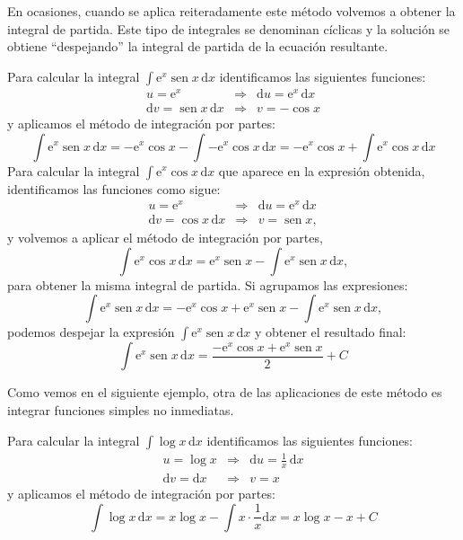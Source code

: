 En ocasiones, cuando se aplica reiteradamente este método volvemos a obtener la integral de partida.
Este tipo de integrales se denominan cíclicas y la solución se obtiene ``despejando'' la integral de partida de la ecuación resultante.
%
\begin{ejemplo}\label{4partcic}
Para calcular la integral $\displaystyle\int \text{e}^x\operatorname{sen} x\,\mathrm dx$ identificamos las siguientes funciones:
%
\begin{eqnarray*}
u=\text{e}^x	& \Longrightarrow & \mathrm du=\text{e}^x\,\mathrm dx			\\
\mathrm dv=\operatorname{sen} x\,\mathrm dx	& \Longrightarrow & v=-\cos x
\end{eqnarray*}
%
y aplicamos el método de integración por partes:
$$
\displaystyle\int \text{e}^x\operatorname{sen} x\,\mathrm dx = -\text{e}^x\cos x - \displaystyle\int -\text{e}^x\cos x\,\mathrm dx = -\text{e}^x\cos x + \displaystyle\int \text{e}^x\cos x\,\mathrm dx
$$ 
Para calcular la integral $\displaystyle\int \text{e}^x\cos x\,\mathrm dx$ que aparece en la expresión obtenida, identificamos las funciones como sigue:
%
\begin{eqnarray*}
u=\text{e}^x	& \Longrightarrow & \mathrm du=\text{e}^x\,\mathrm dx			\\
\mathrm dv=\cos x\,\mathrm dx	& \Longrightarrow & v=\operatorname{sen} x,
\end{eqnarray*}
%
y volvemos a aplicar el método de integración por partes,
$$
\displaystyle\int \text{e}^x\cos x\,\mathrm dx = \text{e}^x\operatorname{sen} x-\displaystyle\int\text{e}^x\operatorname{sen} x\,\mathrm dx,
$$
para obtener la misma integral de partida.
Si agrupamos las expresiones:
$$
\displaystyle\int \text{e}^x\operatorname{sen} x\,\mathrm dx =
-\text{e}^x\cos x + \text{e}^x\operatorname{sen} x - \displaystyle\int\text{e}^x\operatorname{sen} x\,\mathrm dx,
$$
podemos despejar la expresión $\displaystyle\int \text{e}^x\operatorname{sen} x\,\mathrm dx$ y obtener el resultado final:
\[
\displaystyle\int \text{e}^x\operatorname{sen} x\,\mathrm dx = \dfrac{-\text{e}^x\cos x + \text{e}^x\operatorname{sen} x}{2} + C\tag*{\fej}
\]
\end{ejemplo}

Como vemos en el siguiente ejemplo, otra de las aplicaciones de este método es integrar funciones simples no inmediatas. 
%
\begin{ejemplo}\label{4parteslog}
Para calcular la integral $\displaystyle\int \log x\,\mathrm dx$ identificamos las siguientes funciones:
\begin{eqnarray*}
u=\log x	& \Longrightarrow & \mathrm du=\frac{1}{x}\,\mathrm dx			\\
\mathrm dv=\mathrm dx	& \Longrightarrow & v=x
\end{eqnarray*}
y aplicamos el método de integración por partes:
\begin{equation}
\displaystyle\int \log x\,\mathrm dx = x\log x - \displaystyle\int x\cdot\dfrac1x\mathrm dx = x\log x - x  + C\tag*{\fej}
\end{equation}
\end{ejemplo}

